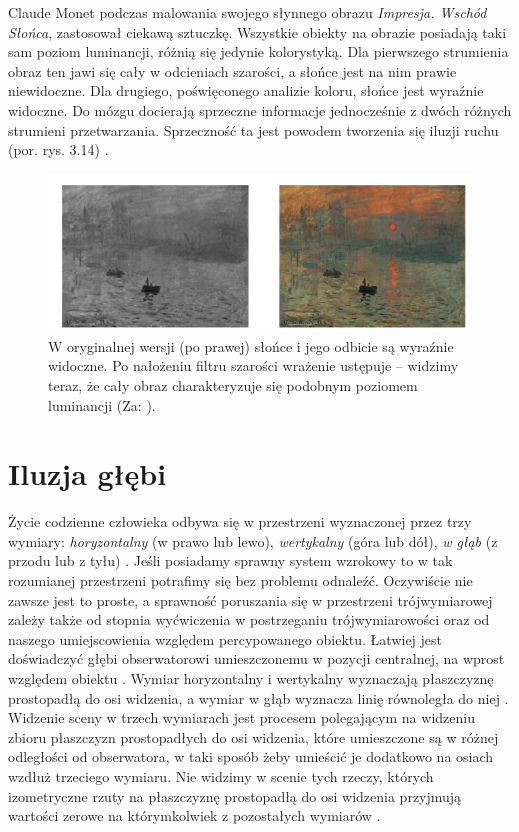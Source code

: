 \documentclass[licencjacka]{kdypl}
\begin{document}
Claude Monet podczas malowania swojego słynnego obrazu \textit{Impresja. Wschód Słońca}, zastosował ciekawą sztuczkę. Wszystkie obiekty na obrazie posiadają taki sam poziom luminancji, różnią się jedynie kolorystyką. Dla pierwszego strumienia obraz ten jawi się cały w odcieniach szarości, a słońce jest na nim prawie niewidoczne. Dla drugiego, poświęconego analizie koloru, słońce jest wyraźnie widoczne. Do mózgu docierają  sprzeczne informacje jednocześnie z dwóch różnych strumieni przetwarzania. Sprzeczność ta jest powodem tworzenia się iluzji ruchu (por. rys. 3.14) \citep[s. 116]{neurostetyka}.
 
\begin{figure}[H]
\includegraphics[width=\textwidth]{monet.png}
\centering
\caption{W oryginalnej wersji (po prawej) słońce i jego odbicie są wyraźnie widoczne. Po nałożeniu filtru szarości wrażenie ustępuje -- widzimy teraz, że cały obraz charakteryzuje się podobnym poziomem luminancji (Za: \citealt[s. 116]{neurostetyka}).}
\end{figure}



\section{Iluzja głębi}

Życie codzienne człowieka odbywa się w przestrzeni wyznaczonej przez trzy wymiary: \textit{horyzontalny} (w prawo lub lewo), \textit{wertykalny} (góra lub dół), \textit{w głąb} (z przodu lub z tyłu) \citep[s. 221]{Francuz}.
Jeśli posiadamy sprawny system wzrokowy to w tak rozumianej przestrzeni potrafimy się bez problemu odnaleźć. Oczywiście nie zawsze jest to proste, a sprawność poruszania się w przestrzeni trójwymiarowej zależy także od stopnia wyćwiczenia w postrzeganiu trójwymiarowości oraz od naszego umiejscowienia względem percypowanego obiektu. Łatwiej jest doświadczyć głębi obserwatorowi umieszczonemu w pozycji centralnej, na wprost względem obiektu \citep[s. 223]{Francuz}. Wymiar horyzontalny i wertykalny wyznaczają płaszczyznę prostopadłą do osi widzenia, a wymiar w głąb wyznacza linię równoległa do niej \citep[s.221-222]{Francuz}. Widzenie sceny w trzech wymiarach jest procesem polegającym na  widzeniu zbioru płaszczyzn prostopadłych do osi widzenia, które umieszczone są  w różnej odległości od obserwatora, w taki sposób żeby umieścić je dodatkowo na osiach wzdłuż trzeciego wymiaru. Nie widzimy w scenie tych rzeczy, których izometryczne rzuty na płaszczyznę prostopadłą do osi widzenia przyjmują wartości zerowe na którymkolwiek z pozostałych wymiarów \citep[s. 220-221]{Francuz}.
\end{document}
